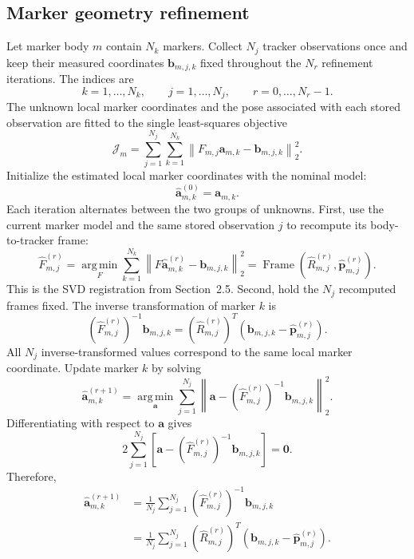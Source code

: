 \documentclass[11pt]{article}
\newcommand{\vct}[1]{\bm{#1}}
\newcommand{\Frame}{\operatorname{Frame}}
\newcommand{\norm}[1]{\left\|#1\right\|_2}
\begin{document}
\subsection{Marker geometry refinement}
Let marker body $m$ contain $N_k$ markers.  Collect $N_j$ tracker observations
once and keep their measured coordinates $\vct{b}_{m,j,k}$ fixed throughout
the $N_r$ refinement iterations.  The indices are
\[
k=1,\ldots,N_k,\qquad
j=1,\ldots,N_j,\qquad
r=0,\ldots,N_r-1.
\]
The unknown local marker coordinates and the pose associated with each stored
observation are fitted to the single least-squares objective
\begin{equation}
\mathcal J_m
=
\sum_{j=1}^{N_j}\sum_{k=1}^{N_k}
\norm{
F_{m,j}\vct{a}_{m,k}
-\vct{b}_{m,j,k}
}^2.
\end{equation}
Initialize the estimated local marker coordinates with the nominal model:
\begin{equation}
\widehat{\vct{a}}_{m,k}^{(0)}=\vct{a}_{m,k}.
\end{equation}
Each iteration alternates between the two groups of unknowns.  First, use the
current marker model and the same stored observation $j$ to recompute its
body-to-tracker frame:
\begin{equation}
\widehat F_{m,j}^{(r)}
=
\underset{F}{\operatorname{arg\,min}}
\sum_{k=1}^{N_k}
\norm{
F\widehat{\vct{a}}_{m,k}^{(r)}
-\vct{b}_{m,j,k}
}^2
=
\Frame(\widehat R_{m,j}^{(r)},\widehat{\vct{p}}_{m,j}^{(r)}).
\end{equation}
This is the SVD registration from Section~2.5.  Second, hold the $N_j$
recomputed frames fixed.  The inverse transformation of marker $k$ is
\begin{equation}
(\widehat F_{m,j}^{(r)})^{-1}\vct{b}_{m,j,k}
=
(\widehat R_{m,j}^{(r)})^T
\left(
\vct{b}_{m,j,k}
-\widehat{\vct{p}}_{m,j}^{(r)}
\right).
\end{equation}
All $N_j$ inverse-transformed values correspond to the same local marker
coordinate.  Update marker $k$ by solving
\begin{equation}
\widehat{\vct{a}}_{m,k}^{(r+1)}
=
\underset{\vct{a}}{\operatorname{arg\,min}}
\sum_{j=1}^{N_j}
\norm{
\vct{a}
-
(\widehat F_{m,j}^{(r)})^{-1}
\vct{b}_{m,j,k}
}^2.
\end{equation}
Differentiating with respect to $\vct{a}$ gives
\begin{equation}
2\sum_{j=1}^{N_j}
\left[
\vct{a}
-
(\widehat F_{m,j}^{(r)})^{-1}
\vct{b}_{m,j,k}
\right]
=\vct{0}.
\end{equation}
Therefore,
\begin{equation}
\boxed{
\begin{aligned}
\widehat{\vct{a}}_{m,k}^{(r+1)}
&=
\frac{1}{N_j}
\sum_{j=1}^{N_j}
(\widehat F_{m,j}^{(r)})^{-1}
\vct{b}_{m,j,k}\\
&=
\frac{1}{N_j}
\sum_{j=1}^{N_j}
(\widehat R_{m,j}^{(r)})^T
\left(
\vct{b}_{m,j,k}
-\widehat{\vct{p}}_{m,j}^{(r)}
\right).
\end{aligned}}
\end{equation}
\end{document}
